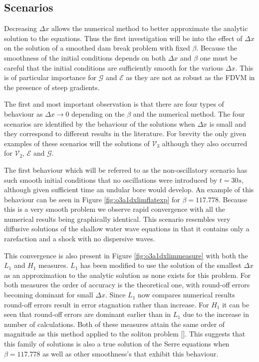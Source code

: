 \documentclass[SingleSpace,12pt,Journal]{Serre_ASCE}
\begin{document}
\subsection{Scenarios}
Decreasing $\Delta x$ allows the numerical method to better approximate the analytic solution to the equations. Thus the first investigation will be into the effect of $\Delta x$ on the solution of a smoothed dam break problem with fixed $\beta$. Because the smoothness of the initial conditions depends on both $\Delta x$ and $\beta$ one must be careful that the initial conditions are sufficiently smooth for the various $\Delta x$. This is of particular importance for $\mathcal{G}$ and $\mathcal{E}$ as they are not as robust as the FDVM in the presence of steep gradients.

The first and most important observation is that there are four types of behaviour as $\Delta x \rightarrow 0$ depending on the $\beta$ and the numerical method. The four scenarios are identified by the behaviour of the solutions when $\Delta x$ is small and they correspond to different results in the literature. For brevity the only given examples of these scenarios will the solutions of $\mathcal{V}_3$ although they also occurred for $\mathcal{V}_2$, $\mathcal{E}$ and $\mathcal{G}$.

The first behaviour which will be referred to as the non-oscillatory scenario has such smooth initial conditions that no oscillations were introduced by $t= 30s$, although given sufficient time an undular bore would develop. An example of this behaviour can be seen in Figure \ref{fig:o3a1dxlimflatexp} for $\beta = 117.778$. Because this is a very smooth problem we observe rapid convergence with all the numerical results being graphically identical. This scenario resembles very diffusive solutions of the shallow water wave equations in that it contains only a rarefaction and a shock with no dispersive waves. 

This convergence is also present in Figure \ref{fig:o3a1dxlimmeasure} with both the $L_1$ and $H_1$ measures. $L_1$ has been modified to use the solution of the smallest $\Delta x$ as an approximation to the analytic solution as none exists for this problem. For both measures the order of accuracy is the theoretical one, with round-off errors becoming dominant for small $\Delta x$. Since $L_1$ now compares numerical results round-off errors result in error stagnation rather than increase. For $H_1$ it can be seen that round-off errors are dominant earlier than in $L_1$ due to the increase in number of calculations. Both of these measures attain the same order of magnitude as this method applied to the soliton problem []. This suggests that this family of solutions is also a true solution of the Serre equations when $\beta = 117.778$ as well as other smoothness's that exhibit this behaviour. 
\end{document}
